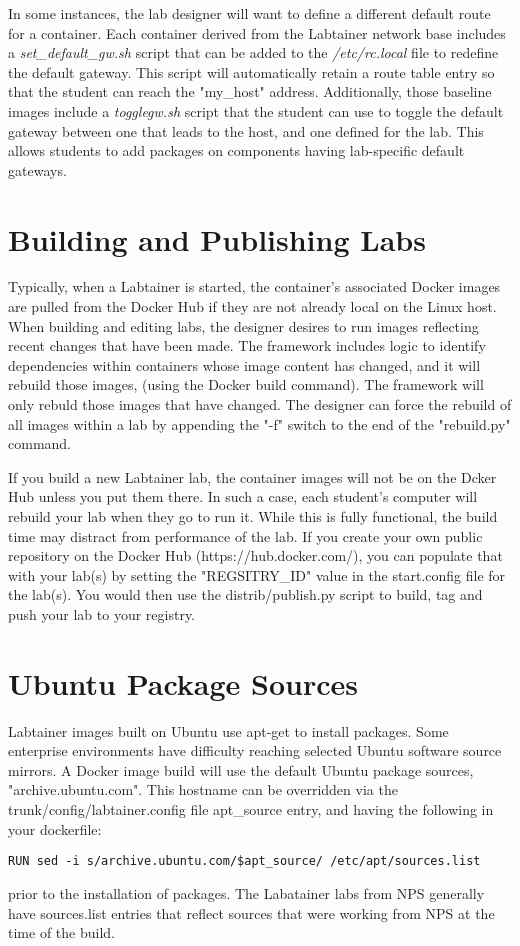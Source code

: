 \documentclass[12pt]{article}
\begin{document}
In some instances, the lab designer will want to define a different default route for a 
container.  Each container derived from the Labtainer network base includes a \textit{set\_default\_gw.sh}
script that can be added to the \textit{/etc/rc.local} file to redefine the default gateway.
This script will automatically retain a route table entry so that the student can reach the "my\_host"
address.  Additionally, those baseline images include a \textit{togglegw.sh} script that the student
can use to toggle the default gateway between one that leads to the host, and one defined for the lab.
This allows students to add packages on components having lab-specific default gateways.

\section{Building and Publishing Labs} \label{publishing}
Typically, when a Labtainer is started, the container's associated Docker images are pulled from
the Docker Hub if they are not already local on the Linux host.  When building and editing labs,
the designer desires to run images reflecting recent changes that have been made.  The framework
includes logic to identify dependencies within containers whose image content has changed, 
and it will rebuild those images, (using the Docker build command).  The framework will only 
rebuld those images that have changed.  The designer can force the rebuild of all images within
a lab by appending the "-f" switch to the end of the "rebuild.py" command.

If you build a new Labtainer lab, the container images will not be on the Dcker Hub unless you put
them there.  In such a case, each student's computer will rebuild your lab when they go to run it.
While this is fully functional, the build time may distract from performance of the lab.  If you
create your own public repository on the Docker Hub (https://hub.docker.com/), you can populate that
with your lab(s) by setting the "REGSITRY\_ID" value in the start.config file for the lab(s). You
would then use the distrib/publish.py script to build, tag and push your lab to your registry.

\section{Ubuntu Package Sources}
Labtainer images built on Ubuntu use apt-get to install packages.  Some enterprise environments have 
difficulty reaching selected Ubuntu software source mirrors.  A Docker image build will use the default 
Ubuntu package sources, "archive.ubuntu.com".  This hostname can be overridden via the 
trunk/config/labtainer.config file apt\_source entry, and having the following in your dockerfile:
\begin{verbatim}
RUN sed -i s/archive.ubuntu.com/$apt_source/ /etc/apt/sources.list
\end{verbatim}
\noindent prior to the installation of packages.  The Labatainer labs from NPS 
generally have sources.list entries that reflect sources that were working from NPS at the time of the build.
\end{document}

